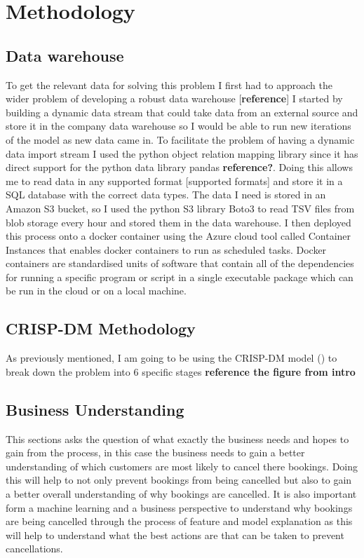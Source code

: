 \chapter{Methodology}
\label{ch:method}

\section{Data warehouse}
To get the relevant data for solving this problem I first had to approach the wider problem of developing a robust data warehouse [\textbf{reference}] I started by building a dynamic data stream that could take data from an external source and store it in the company data warehouse so I would be able to run new iterations of the model as new data came in. To facilitate the problem of having a dynamic data import stream I used the python object relation mapping library \cite{SQLAlchemyPython} since it has direct support for the python data library pandas \textbf{reference?}. Doing this allows me to read data in any supported format [supported formats] and store it in a SQL database with the correct data types. The data I need is stored in an Amazon S3 bucket, so I used the python S3 library Boto3 to read TSV files from blob storage every hour and stored them in the data warehouse. I then deployed this process onto a docker container using the Azure cloud tool called Container Instances that enables docker containers to run as scheduled tasks. Docker containers are standardised units of software that contain all of the dependencies for running a specific program or script in a single executable package which can be run in the cloud or on a local machine.

\section{CRISP-DM Methodology}

As previously mentioned, I am going to be using the CRISP-DM model (\cite{WirthCRISP-DM:Mining}) to break down the problem into 6 specific stages \textbf{reference the figure from intro} 

\section{Business Understanding}

This sections asks the question of what exactly the business needs and hopes to gain from the process, in this case the business needs to gain a better understanding of which customers are most likely to cancel there bookings. Doing this will help to not only prevent bookings from being cancelled but also to gain a better overall understanding of why bookings are cancelled. It is also important form a machine learning and a business perspective to understand why bookings are being cancelled through the process of feature and model explanation as this will help to understand what the best actions are that can be taken to prevent cancellations.

